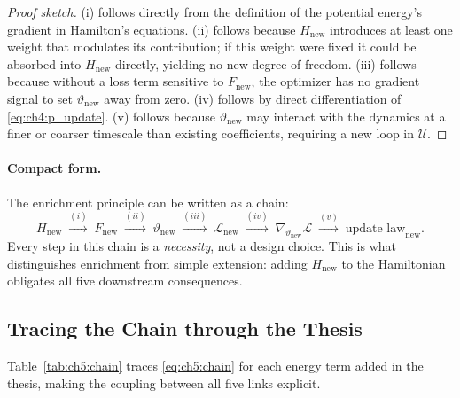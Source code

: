 \begin{proof}[Proof sketch]
(i) follows directly from the definition of the potential energy's
gradient in Hamilton's equations.
(ii) follows because $H_{\mathrm{new}}$ introduces at least one weight
that modulates its contribution; if this weight were fixed it could be
absorbed into $H_{\mathrm{new}}$ directly, yielding no new degree of
freedom.
(iii) follows because without a loss term sensitive to
$F_{\mathrm{new}}$, the optimizer has no gradient signal to set
$\vartheta_{\mathrm{new}}$ away from zero.
(iv) follows by direct differentiation of \eqref{eq:ch4:p_update}.
(v) follows because $\vartheta_{\mathrm{new}}$ may interact with
the dynamics at a finer or coarser timescale than existing
coefficients, requiring a new loop in $\mathcal{U}$.
\end{proof}

\paragraph{Compact form.}
The enrichment principle can be written as a chain:
\begin{equation}
  H_{\mathrm{new}}
  \;\xrightarrow{(i)}\; F_{\mathrm{new}}
  \;\xrightarrow{(ii)}\; \vartheta_{\mathrm{new}}
  \;\xrightarrow{(iii)}\; \mathcal{L}_{\mathrm{new}}
  \;\xrightarrow{(iv)}\; \nabla_{\vartheta_{\mathrm{new}}}\mathcal{L}
  \;\xrightarrow{(v)}\; \text{update law}_{\mathrm{new}}.
  \label{eq:ch5:chain}
\end{equation}
Every step in this chain is a \emph{necessity}, not a design choice.
This is what distinguishes enrichment from simple extension: adding
$H_{\mathrm{new}}$ to the Hamiltonian obligates all five downstream
consequences.

\subsection{Tracing the Chain through the Thesis}
\label{subsec:ch5:chain_traced}

Table~\ref{tab:ch5:chain} traces \eqref{eq:ch5:chain} for each energy
term added in the thesis, making the coupling between all five links
explicit.

